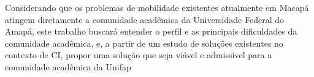 Considerando que os problemas de mobilidade existentes atualmente em Macapá atingem diretamente a comunidade acadêmica da Universidade Federal do Amapá, este trabalho buscará entender o perfil e as principais dificuldades da comunidade acadêmica, e, a partir de um estudo de soluções existentes no contexto de CI, propor uma solução que seja viável e admissível para a comunidade acadêmica da Unifap


\begin{comment}
\textit{\textbf{NOTA - Poderia finalizar com um texto mais ou menos assim:}
Considerando que os problemas de mobilidade existentes atualmente em Macapá atingem diretamente a comunidade acadêmica da Universidade Federal do Amapá, este trabalho buscará entender o perfil e as principais dificuldades da comunidade acadêmica, e, a partir de um estudo de soluções existentes no contexto de cidades inteligentes, propor uma solução que seja viável e admisível para a comunidade acadêmica da Unifap....
\textbf{Algo assim.}}

\end{comment}

\begin{comment}
Com a intenção de apresentar uma alternativa de mobilidade à comunidade acadêmica da Universidade, a proposta de aplicativo de caronas tem como objetivo dar mais uma opção de transporte de entrada e saída dos alunos, professores e técnicos da Unifap.
\end{comment}



